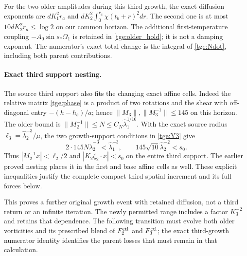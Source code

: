 For the two older amplitudes during this third growth, the exact
diffusion exponents are $dK_1^2r_a$ and
$dK_2^2\int_0^{r_a}\chi(t_b+r)^2dr$. The second one is at most
$10dK_2^2r_a\leq\log2$ on our common horizon. The additional
first-temperature coupling $-A_0\sin s_*\Omega_1$ is retained in
\eqref{tge:older_hold}; it is not a damping exponent.
The numerator's exact total change is the integral of
\eqref{tge:Ndot}, including both parent contributions.

\paragraph{Exact third support nesting.}\label{tge:nesting}
The source third support also fits the changing exact affine cells.
Indeed the relative matrix \eqref{tge:phase} is a product of two
rotations and the shear with off-diagonal entry $-(h-h_b)/a$;
hence $\|M_3\|,\|M_3^{-1}\|\leq145$ on this horizon.
The older bound is $\|M_2^{-1}\|\leq N\leq
C_N\widehat\lambda_1^{1/16}$. With the exact source radius
$\ell_3=\widehat\lambda_2^{-3}/\mu$, the two growth-support conditions
in \eqref{tge:Y3} give
\[
 2\cdot145N\widehat\lambda_2^{-3}<\widehat\lambda_1^{-3},
 \qquad145\sqrt{10}\widehat\lambda_2^{-2}<s_0.
\]
Thus $|M_2^{-1}x|<\ell_2/2$ and
$|K_2\zeta_2\cdot x|<s_0$ on the entire third support.
The earlier proved nesting places it in the first and base affine
cells as well. These explicit inequalities justify the complete
compact third spatial increment and its full forces below.

This proves a further original growth event with retained diffusion,
not a third return or an infinite iteration. The newly permitted
range includes a factor $K_3^{-2}$ and retains that dependence.
The following transition must evolve both older vorticities and its
prescribed blend of $F_2^{\rm ctl}$ and $F_3^{\rm ctl}$; the exact
third-growth numerator identity identifies the parent losses that
must remain in that calculation.
